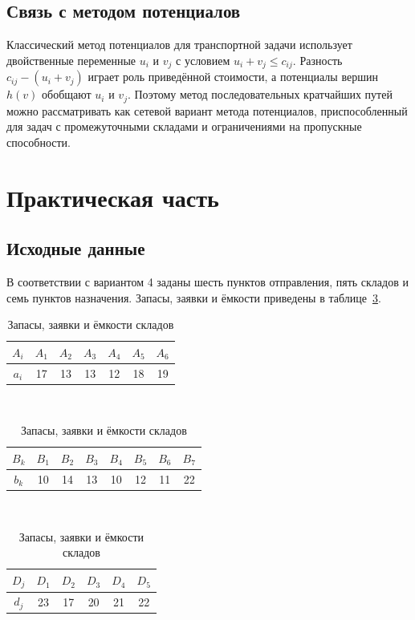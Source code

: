 \subsection*{Связь с методом потенциалов}

Классический метод потенциалов для транспортной задачи использует
двойственные переменные $u_i$ и $v_j$ с условием $u_i+v_j\le c_{ij}$.
Разность $c_{ij}-(u_i+v_j)$ играет роль приведённой стоимости, а потенциалы
вершин $h(v)$ обобщают $u_i$ и $v_j$. Поэтому метод последовательных
кратчайших путей можно рассматривать как сетевой вариант метода потенциалов,
приспособленный для задач с промежуточными складами и ограничениями на
пропускные способности.

\clearpage

\section{Практическая часть}

\subsection*{Исходные данные}

В соответствии с вариантом 4 заданы шесть пунктов отправления, пять складов
и семь пунктов назначения. Запасы, заявки и ёмкости приведены в
таблице~\ref{tab:input}.

\begin{table}[h!]
\centering
\caption{Запасы, заявки и ёмкости складов}
\label{tab:input}
\small
\begin{tabular}{c|cccccc}
\hline
$A_i$ & $A_1$ & $A_2$ & $A_3$ & $A_4$ & $A_5$ & $A_6$ \\
\hline
$a_i$ & 17 & 13 & 13 & 12 & 18 & 19 \\
\hline
\end{tabular}\\[2mm]
\begin{tabular}{c|ccccccc}
\hline
$B_k$ & $B_1$ & $B_2$ & $B_3$ & $B_4$ & $B_5$ & $B_6$ & $B_7$ \\
\hline
$b_k$ & 10 & 14 & 13 & 10 & 12 & 11 & 22 \\
\hline
\end{tabular}\\[2mm]
\begin{tabular}{c|ccccc}
\hline
$D_j$ & $D_1$ & $D_2$ & $D_3$ & $D_4$ & $D_5$ \\
\hline
$d_j$ & 23 & 17 & 20 & 21 & 22 \\
\hline
\end{tabular}
\end{table}

